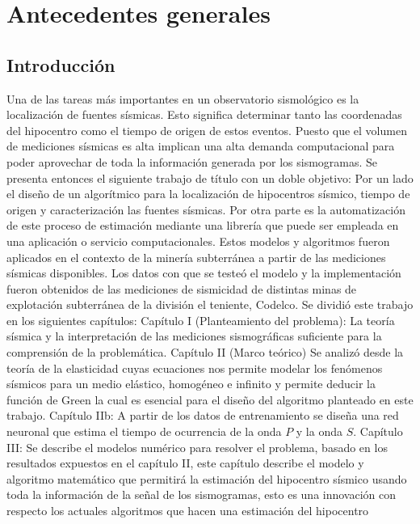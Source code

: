
\chapter{Antecedentes generales}



\section{Introducción}

Una de las tareas más importantes en un observatorio sismológico es la
localización de fuentes sísmicas. Esto significa determinar tanto las
coordenadas del hipocentro como el tiempo de origen de estos eventos. Puesto
que el volumen de mediciones sísmicas es alta implican una alta demanda
computacional para poder aprovechar de toda la información generada por los
sismogramas.
Se presenta entonces el siguiente trabajo de título con un doble objetivo: Por
un lado el diseño  de un algorítmico para la localización de hipocentros
sísmico, tiempo de origen y caracterización las fuentes sísmicas. Por otra parte es la
automatización de este proceso de estimación mediante una librería que puede ser
empleada en una aplicación o servicio computacionales.
Estos modelos y algoritmos fueron aplicados en el contexto de la minería
subterránea a partir de las mediciones sísmicas disponibles. Los datos con
que se testeó el modelo y la implementación fueron obtenidos de las mediciones
de sismicidad de distintas minas de explotación subterránea de la división el
teniente, Codelco.
Se dividió este trabajo en los siguientes capítulos:
Capítulo I (Planteamiento del problema): La teoría sísmica y la interpretación
de las mediciones sismográficas suficiente para la comprensión de la problemática.
Capítulo II (Marco teórico) Se analizó desde la teoría de la elasticidad cuyas
ecuaciones nos permite modelar los fenómenos sísmicos para un medio elástico, homogéneo e
infinito y permite deducir la función de Green la cual es esencial para el
diseño del algoritmo planteado en este trabajo.
Capítulo IIb: A partir de los datos de entrenamiento se diseña una red neuronal
que estima el tiempo de ocurrencia de la onda $P$ y la onda $S$.
Capítulo III: Se describe el modelos numérico para resolver el problema, basado
en los resultados expuestos en el capítulo II, este capítulo describe el modelo
y algoritmo matemático que permitirá la estimación del hipocentro sísmico usando
toda la información de la señal de los sismogramas, esto es una innovación con
respecto los actuales algoritmos que hacen una estimación del hipocentro
